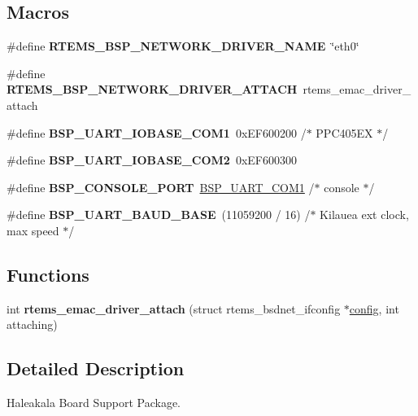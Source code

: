 \subsection*{Macros}
\begin{DoxyCompactItemize}
\item 
\mbox{\label{group__RTEMSBSPsPowerPCHaleakala_ga86d4f9aa98431100692e31068070a8df}} 
\#define {\bfseries R\+T\+E\+M\+S\+\_\+\+B\+S\+P\+\_\+\+N\+E\+T\+W\+O\+R\+K\+\_\+\+D\+R\+I\+V\+E\+R\+\_\+\+N\+A\+ME}~\char`\"{}eth0\char`\"{}
\item 
\mbox{\label{group__RTEMSBSPsPowerPCHaleakala_gadde0d66aef9442971dde465292ac14e6}} 
\#define {\bfseries R\+T\+E\+M\+S\+\_\+\+B\+S\+P\+\_\+\+N\+E\+T\+W\+O\+R\+K\+\_\+\+D\+R\+I\+V\+E\+R\+\_\+\+A\+T\+T\+A\+CH}~rtems\+\_\+emac\+\_\+driver\+\_\+attach
\item 
\mbox{\label{group__RTEMSBSPsPowerPCHaleakala_gab259f83c40cdf929716d93a04b510006}} 
\#define {\bfseries B\+S\+P\+\_\+\+U\+A\+R\+T\+\_\+\+I\+O\+B\+A\+S\+E\+\_\+\+C\+O\+M1}~0x\+E\+F600200    /$\ast$ P\+P\+C405\+E\+X $\ast$/
\item 
\mbox{\label{group__RTEMSBSPsPowerPCHaleakala_ga2475131339f3941237ce2f311cdc4492}} 
\#define {\bfseries B\+S\+P\+\_\+\+U\+A\+R\+T\+\_\+\+I\+O\+B\+A\+S\+E\+\_\+\+C\+O\+M2}~0x\+E\+F600300
\item 
\mbox{\label{group__RTEMSBSPsPowerPCHaleakala_ga2c88f414089ddba7b640655bcbeffc96}} 
\#define {\bfseries B\+S\+P\+\_\+\+C\+O\+N\+S\+O\+L\+E\+\_\+\+P\+O\+RT}~\mbox{\hyperlink{group__i386__uart_gaa1561064cc8499388f7512347b434d25}{B\+S\+P\+\_\+\+U\+A\+R\+T\+\_\+\+C\+O\+M1}}    /$\ast$ console $\ast$/
\item 
\mbox{\label{group__RTEMSBSPsPowerPCHaleakala_ga4b41bd0ec37c1f8b14ced54ab3a8a6f7}} 
\#define {\bfseries B\+S\+P\+\_\+\+U\+A\+R\+T\+\_\+\+B\+A\+U\+D\+\_\+\+B\+A\+SE}~(11059200 / 16)    /$\ast$ Kilauea ext clock, max speed $\ast$/
\end{DoxyCompactItemize}
\subsection*{Functions}
\begin{DoxyCompactItemize}
\item 
\mbox{\label{group__RTEMSBSPsPowerPCHaleakala_gab6d6de92ace3b59e1b4ef083dcf63425}} 
int {\bfseries rtems\+\_\+emac\+\_\+driver\+\_\+attach} (struct rtems\+\_\+bsdnet\+\_\+ifconfig $\ast$\mbox{\hyperlink{structconfig__s}{config}}, int attaching)
\end{DoxyCompactItemize}


\subsection{Detailed Description}
Haleakala Board Support Package. 

